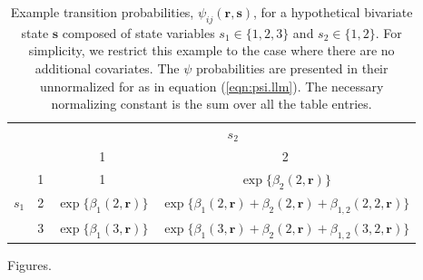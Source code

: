 \documentclass[fleqn]{article}
\newcommand{\bs}{\ensuremath{\mathbf{s}}}
\newcommand{\br}{\ensuremath{\mathbf{r}}}
\begin{document}
\clearpage

\begin{table}[ht]
\centering
\parbox{\textwidth}{\caption{\label{tb:psi.example}  Example transition probabilities, $\psi_{ij}(\br,\bs)$, for a hypothetical bivariate state $\bs$ composed of state variables $s_1\in\{1,2,3\}$ and $s_2\in\{1,2\}$. For simplicity, we restrict this example to the case where there are no additional covariates. The $\psi$ probabilities are presented in their unnormalized for as in equation (\ref{eqn:psi.llm}). The necessary normalizing constant is the sum over all the table entries.}}
\begin{tabular}{cc|cc|} \cline{3-4}
                           &  & \multicolumn{2}{c|}{$s_2$}\\ %
                           &  & 1 & 2 \\ \hline
\multicolumn{1}{|c}{}      & \multicolumn{1}{c|}{1} & 1 & $\exp\{\beta_2(2,\br)\}$ \\
\multicolumn{1}{|c}{$s_1$} & \multicolumn{1}{c|}{2} & $\exp\{\beta_1(2,\br)\}$ & $\exp\{\beta_1(2,\br)+\beta_2(2,\br)+\beta_{1,2}(2,2,\br)\}$ \\
\multicolumn{1}{|c}{}      &  \multicolumn{1}{c|}{3} & $\exp\{\beta_1(3,\br)\}$ & $\exp\{\beta_1(3,\br)+\beta_2(2,\br)+\beta_{1,2}(3,2,\br)\}$ \\ \hline
\end{tabular}
\end{table}



\clearpage

Figures.
\end{document}
